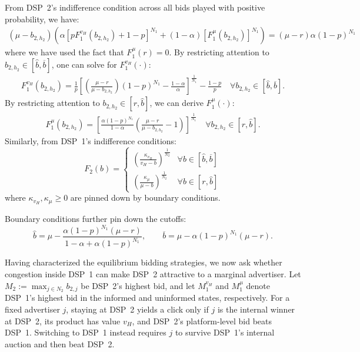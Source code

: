 \documentclass[11pt]{article}
\theoremstyle{plain}
\theoremstyle{definition}
\theoremstyle{plain}
\theoremstyle{plain}
\theoremstyle{plain}
\theoremstyle{plain}
\numberwithin{equation}{section}
\begin{document}
\noindent From DSP~2's indifference condition across all bids played with positive probability, we have:
\begin{align*}
    \left(\mu - b_{2, h_2} \right) \left( \alpha \left[pF_1^{v_H}(b_{2,h_2}) + 1-p \right]^{N_1} + (1-\alpha) \left[F_1^{\mu}(b_{2,h_2})\right]^{N_1} \right) = \left(\mu-r\right)\alpha (1-p)^{N_1}
\end{align*}
where we have used the fact that $F_1^{\mu}(r)=0$. By restricting attention to $b_{2,h_{2}}\in [\hat{b},\overline{b}]$, one can solve for $F_1^{v_H}(\cdot)$:
\begin{align*}
    F_1^{v_H}(b_{2,h_2}) =  \frac{1}{p} \left[ \left( \frac{\mu-r}{\mu - b_{2, h_2}}\right) (1-p)^{N_1} - \frac{1-\alpha}{\alpha}\right]^{\frac{1}{N_1}} - \frac{1-p}{p} \quad \forall b_{2,h_2} \in [\hat{b},\overline{b}].
\end{align*}
By restricting attention to $b_{2,h_{2}}\in [r,\hat{b}]$, we can derive $F_1^{\mu}(\cdot)$:
\begin{align*}
    F_1^{\mu}(b_{2,h_2}) = \left[ \frac{\alpha (1-p)^{N_1}}{1-\alpha} \left( \frac{\mu-r}{\mu - b_{2, h_2}}-1\right)\right]^{\frac{1}{N_1}} \quad \forall b_{2,h_2} \in [r,\hat{b}].
\end{align*}
Similarly, from DSP~1's indifference conditions:
\begin{equation*}
F_2(b) = \begin{cases}
    \left(\frac{\kappa_{v_H}}{v_H-b}\right)^{\frac{1}{N_2}} & \forall b \in [\hat{b}, \overline{b}] \\[5pt]
    \left(\frac{\kappa_{\mu}}{\mu-b}\right)^{\frac{1}{N_2}} & \forall b \in [r, \hat{b}]
\end{cases}
\end{equation*}
where $\kappa_{v_H}, \kappa_{\mu} \geq 0$ are pinned down by boundary conditions.

\vspace{0.4cm}

\noindent Boundary conditions further pin down the cutoffs:
\begin{equation*}
    \hat{b} = \mu - \frac{\alpha(1-p)^{N_1}(\mu-r)}{1-\alpha + \alpha(1-p)^{N_1}}, \qquad
    \overline{b} = \mu - \alpha(1-p)^{N_1}(\mu-r).
\end{equation*}

\noindent Having characterized the equilibrium bidding strategies, we now ask whether congestion inside DSP~1 can make DSP~2 attractive to a marginal advertiser. Let $M_2 := \max_{j \in N_2} b_{2,j}$ be DSP~2's highest bid, and let $M_1^{v_H}$ and $M_1^{\mu}$ denote DSP~1's highest bid in the informed and uninformed states, respectively. For a fixed advertiser $j$, staying at DSP~2 yields a click only if $j$ is the internal winner at DSP~2, its product has value $v_H$, and DSP~2's platform-level bid beats DSP~1. Switching to DSP~1 instead requires $j$ to survive DSP~1's internal auction and then beat DSP~2.
\end{document}
